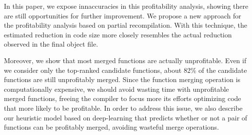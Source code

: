 In this paper, we expose innaccuracies in this profitability analysis, showing there are still opportunities for further improvement.
We propose a new approach for the profitability analysis based on partial recompilation.
With this technique, the estimated reduction in code size more closely resembles the actual reduction observed in the final object file.

Moreover, we show that most merged functions are actually unprofitable.
Even if we consider only the top-ranked candidate functions, about 82\% of the candidate functions are still unprofitably merged.
Since the function merging operation is computationally expensive, we should avoid wasting time with unprofitable merged functions, freeing the compiler to focus more its efforts optimizing code that more likely to be profitable.
In order to address this issue, we also describe our heuristic model based on deep-learning that predicts whether or not a pair of functions can be profitably merged, avoiding wasteful merge operations.


